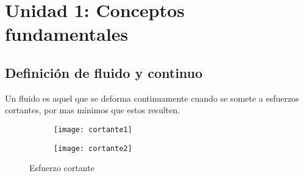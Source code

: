 
\fancyfoot{}
\fancyhead{}
\setlength{\headsep}{1.2cm}

\setlength{\parindent}{0pt}%

\section{Unidad 1: Conceptos fundamentales}
\subsection{Definición de fluido y continuo}
Un fluido es aquel que se deforma continuamente cuando se somete a esfuerzos cortantes, por mas mínimos que estos resulten.
\begin{figure}[h]
	\centering
	\begin{subfigure}[b]{0.45\linewidth}
		\texttt{[image: cortante1]}
	\end{subfigure}
	\begin{subfigure}[b]{0.45\linewidth}
		\texttt{[image: cortante2]}
	\end{subfigure}
	\caption{Esfuerzo cortante}
\end{figure}
